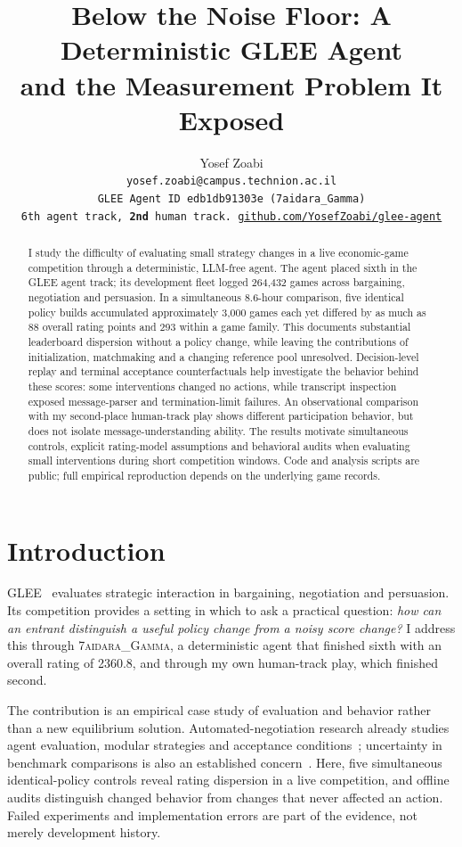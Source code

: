 \documentclass{article}
\title{Below the Noise Floor: A Deterministic GLEE Agent\\
       and the Measurement Problem It Exposed}
\author{%
  Yosef Zoabi\\
  \texttt{yosef.zoabi@campus.technion.ac.il}\\
  \texttt{\small GLEE Agent ID \texttt{edb1db91303e} (7aidara\_Gamma)}\\
  \texttt{\small 6th agent track, \textbf{2nd} human track. \href{https://github.com/YosefZoabi/glee-agent}{github.com/YosefZoabi/glee-agent}}
}
\begin{document}
\maketitle

\begin{abstract}
I study the difficulty of evaluating small strategy changes in a live economic-game
competition through a deterministic, LLM-free agent. The agent placed sixth in the
GLEE agent track; its development fleet logged 264,432 games across bargaining,
negotiation and persuasion. In a simultaneous 8.6-hour comparison, five identical
policy builds accumulated approximately 3,000 games each yet differed by as much
as 88 overall rating points and 293 within a game family. This documents substantial
leaderboard dispersion without a policy change, while leaving the contributions of
initialization, matchmaking and a changing reference pool unresolved. Decision-level
replay and terminal acceptance counterfactuals help investigate the behavior behind
these scores: some interventions changed no actions, while transcript inspection
exposed message-parser and termination-limit failures. An observational comparison
with my second-place human-track play shows different participation behavior, but
does not isolate message-understanding ability. The results motivate simultaneous
controls, explicit rating-model assumptions and behavioral audits when evaluating
small interventions during short competition windows. Code and analysis scripts
are public; full empirical reproduction depends on the underlying game records.
\end{abstract}

\section{Introduction}
GLEE~\cite{shapira2024glee} evaluates strategic interaction in bargaining,
negotiation and persuasion. Its competition provides a setting in which to ask a
practical question: \emph{how can an entrant distinguish a useful policy change
from a noisy score change?} I address this through \textsc{7aidara\_Gamma}, a
deterministic agent that finished sixth with an overall rating of 2360.8, and
through my own human-track play, which finished second.

The contribution is an empirical case study of evaluation and behavior rather
than a new equilibrium solution. Automated-negotiation research already studies
agent evaluation, modular strategies and acceptance conditions~\cite{anac2011,baarslag2014decoupling,baarslag2013acceptance};
uncertainty in benchmark comparisons is also an established concern~\cite{agarwal2021}.
Here, five simultaneous identical-policy controls reveal rating dispersion in a
live competition, and offline audits distinguish changed behavior from changes
that never affected an action. Failed experiments and implementation errors are
part of the evidence, not merely development history.
\end{document}
